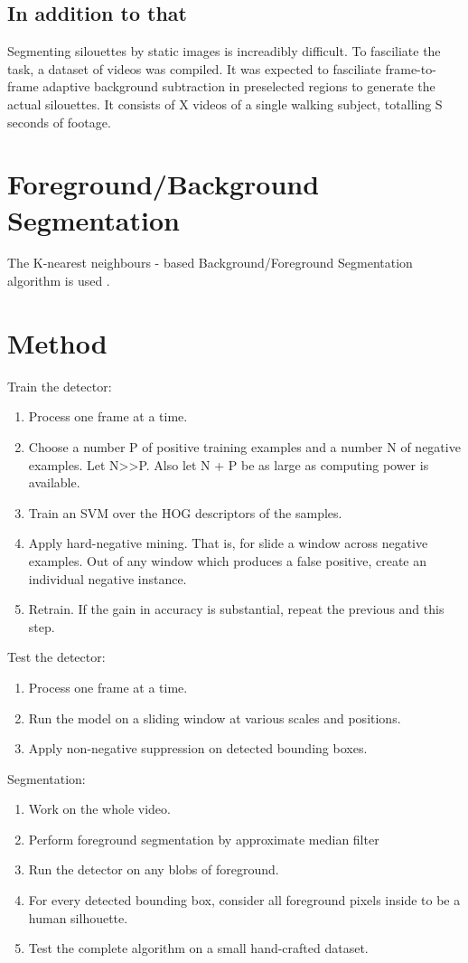 \documentclass{article}
\begin{document}
\subsection{In addition to that}
Segmenting silouettes by static images is increadibly difficult.
To fasciliate the task, a dataset of videos was compiled.
It was expected to fasciliate frame-to-frame adaptive background subtraction in preselected regions to generate the actual silouettes.
It consists of X videos of a single walking subject, totalling S seconds of footage.


\section{Foreground/Background Segmentation}
The K-nearest neighbours - based Background/Foreground Segmentation algorithm is used \cite{knn_background_subt}.


\section{Method}
Train the detector:
\begin{enumerate}
\item{Process one frame at a time.}
\item{Choose a number P of positive training examples and a number N of negative examples. Let N>>P. Also let N + P be as large as computing power is available.}
\item{Train an SVM over the HOG descriptors of the samples.}
\item{Apply hard-negative mining. That is, for slide a window across negative examples. Out of any window which produces a false positive, create an individual negative instance.}
\item{Retrain. If the gain in accuracy is substantial, repeat the previous and this step.}
\end{enumerate}

Test the detector:
\begin{enumerate}
\item{Process one frame at a time.}
\item{Run the model on a sliding window at various scales and positions.}
\item{Apply non-negative suppression on detected bounding boxes.}
\end{enumerate}

Segmentation:
\begin{enumerate}
\item{Work on the whole video.}
\item{Perform foreground segmentation by approximate median filter\cite{amf}}
\item{Run the detector on any blobs of foreground.}
\item{For every detected bounding box, consider all foreground pixels inside to be a human silhouette.}
\item{Test the complete algorithm on a small hand-crafted dataset.}
\end{enumerate}
\end{document}
